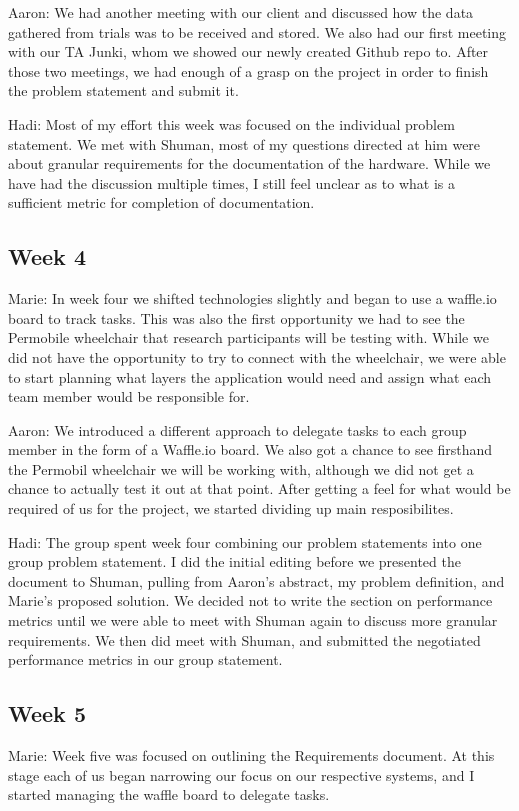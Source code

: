 \documentclass[onecolumn, draftclsnofoot,10pt, compsoc]{IEEEtran}
\begin{document}
Aaron: We had another meeting with our client and discussed how the data gathered from trials was to be received and stored. We also had our first meeting with our TA Junki, whom we showed our newly created Github repo to. After those two meetings, we had enough of a grasp on the project in order to finish the problem statement and submit it.\par

Hadi: Most of my effort this week was focused on the individual problem statement. We met with Shuman, most of my questions directed at him were about granular requirements for the documentation of the hardware. While we have had the discussion multiple times, I still feel unclear as to what is a sufficient metric for completion of documentation. \par

\subsection{Week 4}
Marie: In week four we shifted technologies slightly and began to use a waffle.io board to track tasks. This was also the first opportunity we had to see the Permobile wheelchair that research participants will be testing with. While we did not have the opportunity to try to connect with the wheelchair, we were able to start planning what layers the application would need and assign what each team member would be responsible for.\par

Aaron: We introduced a different approach to delegate tasks to each group member in the form of a Waffle.io board. We also got a chance to see firsthand the Permobil wheelchair we will be working with, although we did not get a chance to actually test it out at that point. After getting a feel for what would be required of us for the project, we started dividing up main resposibilites.\par

Hadi: The group spent week four combining our problem statements into one group problem statement. I did the initial editing before we presented the document to Shuman, pulling from Aaron's abstract, my problem definition, and Marie's proposed solution. We decided not to write the section on performance metrics until we were able to meet with Shuman again to discuss more granular requirements. We then did meet with Shuman, and submitted the negotiated performance metrics in our group statement. 

\subsection{Week 5}
Marie: Week five was focused on outlining the Requirements document. At this stage each of us began narrowing our focus on our respective systems, and I started managing the waffle board to delegate tasks.\par
\end{document}
